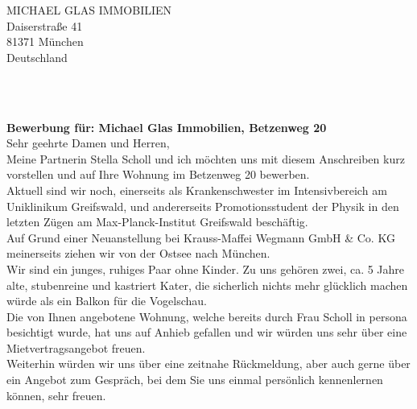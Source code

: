\documentclass[11pt,a4paper]{moderncv}
\newcommand{\posaddress}{%
    MICHAEL GLAS IMMOBILIEN\\%
    Daiserstraße 41\\%
    81371 München\\%
    Deutschland}%
\begin{document}
    \vspace*{1.0cm}
    \begin{minipage}{0.6\textwidth}
        \begin{flushleft}
            \posaddress%
        \end{flushleft}
    \end{minipage}
    \hfill
    \begin{minipage}{0.3\textwidth}
        \begin{flushright}
            \@firstname~\@familyname\\%
            \@addressstreet\\%
            \@addresscity%
        \end{flushright}
    \end{minipage}

    \vspace*{1.0cm}
    {\bfseries \color{familynamecolor}%
        Bewerbung für: Michael Glas Immobilien, Betzenweg 20%
    }\\[0.5cm]
%
    Sehr geehrte Damen und Herren,\\[0.25cm]
%
    Meine Partnerin Stella Scholl und ich möchten uns mit diesem Anschreiben kurz vorstellen und auf Ihre Wohnung im Betzenweg 20 bewerben.\\[0.25cm]%
%
    Aktuell sind wir noch, einerseits als Krankenschwester im Intensivbereich am Uniklinikum Greifswald, und andererseits Promotionsstudent der Physik in den letzten Zügen am Max-Planck-Institut Greifswald beschäftig.\\[0.25cm]
%
    Auf Grund einer Neuanstellung bei Krauss-Maffei Wegmann GmbH \& Co. KG meinerseits ziehen wir von der Ostsee nach München.\\[0.25cm]%
%
    Wir sind ein junges, ruhiges Paar ohne Kinder. Zu uns gehören zwei, ca. 5 Jahre alte, stubenreine und kastriert Kater, die sicherlich nichts mehr glücklich machen würde als ein Balkon für die Vogelschau.\\[0.25cm]%
%
    Die von Ihnen angebotene Wohnung, welche bereits durch Frau Scholl in persona besichtigt wurde, hat uns auf Anhieb gefallen und wir würden uns sehr über eine Mietvertragsangebot freuen.\\[0.25cm]%
%
    Weiterhin würden wir uns über eine zeitnahe Rückmeldung, aber auch gerne über ein Angebot zum Gespräch, bei dem Sie uns einmal persönlich kennenlernen können, sehr freuen.\\%
\end{document}
